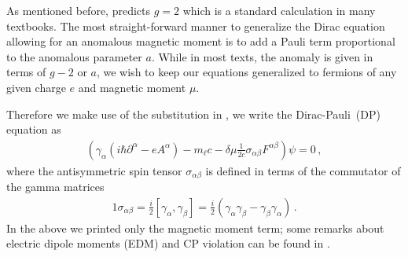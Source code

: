 As mentioned before,  predicts $g\!=\!2$ which is a standard calculation in many textbooks. The most straight-forward manner to generalize the Dirac equation allowing for an anomalous magnetic moment is to add a Pauli term proportional to the anomalous parameter $a$. While in most texts, the anomaly is given in terms of $g-2$ or $a$, we wish to keep our equations generalized to fermions of any given charge $e$ and magnetic moment $\mu$. 

Therefore we make use of the substitution in , we write the Dirac-Pauli~(DP) equation as
\begin{gather}
	\label{dp:1}
    \left(\gamma_{\alpha}\left(i\hbar\partial^{\alpha} - eA^{\alpha}\right) - m_{\ell}c - \delta\mu\frac{1}{2c}\sigma_{\alpha\beta}F^{\alpha\beta}\right)\psi=0\,,
\end{gather}
where the antisymmetric spin tensor $\sigma_{\alpha\beta}$ is defined in terms of the commutator of the gamma matrices
\begin{alignat}{1}
	\label{sigma:1}
    \sigma_{\alpha\beta}=\frac{i}{2}\left[\gamma_{\alpha},\gamma_{\beta}\right]=\frac{i}{2}\left(\gamma_{\alpha}\gamma_{\beta}-\gamma_{\beta}\gamma_{\alpha}\right)\,.
\end{alignat}
In the above we printed only the magnetic moment term; some remarks about electric dipole moments (EDM) and CP violation can be found in .

